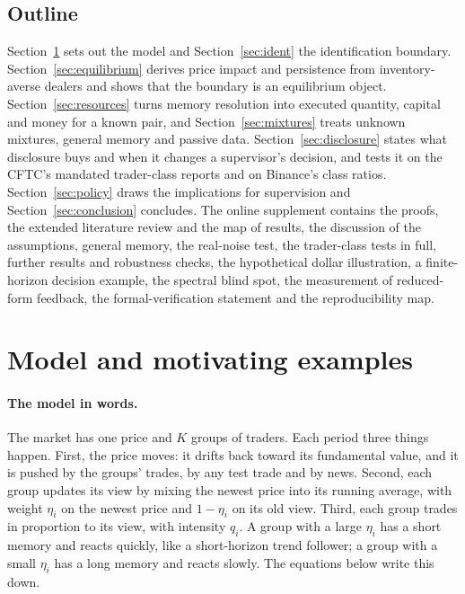 \documentclass[12pt]{article}
\theoremstyle{definition}
\theoremstyle{remark}
\begin{document}
\subsection{Outline}
Section~\ref{sec:model} sets out the model and Section~\ref{sec:ident} the identification boundary. Section~\ref{sec:equilibrium} derives price impact and persistence from inventory-averse dealers and shows that the boundary is an equilibrium object. Section~\ref{sec:resources} turns memory resolution into executed quantity, capital and money for a known pair, and Section~\ref{sec:mixtures} treats unknown mixtures, general memory and passive data. Section~\ref{sec:disclosure} states what disclosure buys and when it changes a supervisor's decision, and tests it on the CFTC's mandated trader-class reports and on Binance's class ratios. Section~\ref{sec:policy} draws the implications for supervision and Section~\ref{sec:conclusion} concludes. The online supplement contains the proofs, the extended literature review and the map of results, the discussion of the assumptions, general memory, the real-noise test, the trader-class tests in full, further results and robustness checks, the hypothetical dollar illustration, a finite-horizon decision example, the spectral blind spot, the measurement of reduced-form feedback, the formal-verification statement and the reproducibility map.

\section{Model and motivating examples}\label{sec:model}

\paragraph{The model in words.} The market has one price and $K$ groups of traders. Each period three things happen. First, the price moves: it drifts back toward its fundamental value, and it is pushed by the groups' trades, by any test trade and by news. Second, each group updates its view by mixing the newest price into its running average, with weight $\eta_i$ on the newest price and $1-\eta_i$ on its old view. Third, each group trades in proportion to its view, with intensity $q_i$. A group with a large $\eta_i$ has a short memory and reacts quickly, like a short-horizon trend follower; a group with a small $\eta_i$ has a long memory and reacts slowly. The equations below write this down.
\end{document}
